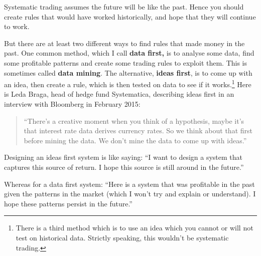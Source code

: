 Systematic trading assumes the future will be like the past. Hence you should create rules that would have worked historically, and hope that they will continue to work.

But there are at least two different ways to find rules that made money in the past. One common method, which I call \textbf{data first,} is to analyse some data, find some profitable patterns and create some trading rules to exploit them. This is sometimes called \textbf{data mining}. The alternative, \textbf{ideas first}, is to come up with an idea, then create a rule, which is then tested on data to see if it works.\footnote{There is a third method which is to use an idea which you cannot or will not test on historical data. Strictly speaking, this wouldn't be systematic trading.} Here is Leda Braga, head of hedge fund Systematica, describing ideas first in an interview with Bloomberg in February 2015:

\begin{quote}
``There's a creative moment when you think of a hypothesis, maybe it's that interest rate data derives currency rates. So we think about that first before mining the data. We don't mine the data to come up with ideas.''
\end{quote}

Designing an ideas first system is like saying: ``I want to design a system that captures this source of return. I hope this source is still around in the future.''

Whereas for a data first system: ``Here is a system that was profitable in the past given the patterns in the market (which I won't try and explain or understand). I hope these patterns persist in the future.''

